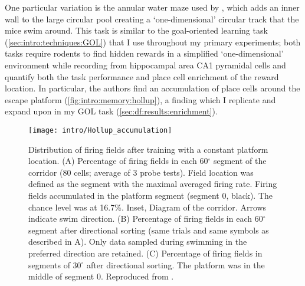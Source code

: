 One particular variation is the annular water maze used by \citeauthor{Hollup2001a}, which adds an inner wall to the large circular pool creating a `one-dimensional' circular track that the mice swim around.
This task is similar to the goal-oriented learning task (\autoref{sec:intro:techniques:GOL}) that I use throughout my primary experiments; both tasks require rodents to find hidden rewards in a simplified `one-dimensional' environment while recording from hippocampal area CA1 pyramidal cells and quantify both the task performance and place cell enrichment of the reward location.
In particular, the authors find an accumulation of place cells around the escape platform (\autoref{fig:intro:memory:hollup}), a finding which I replicate and expand upon in my GOL task (\autoref{sec:df:results:enrichment}). 
\begin{figure}
	\centering
	\texttt{[image: intro/Hollup\_accumulation]}
	\caption[Distribution of firing fields from Hollup et al.]{Distribution of firing fields after training with a constant platform location.
	(A) Percentage of firing fields in each 60$^{\circ}$ segment of the corridor (80 cells; average of 3 probe tests). Field location was defined as the segment with the maximal averaged firing rate. Firing fields accumulated in the platform segment (segment 0, black). The chance level was at 16.7\%. Inset, Diagram of the corridor. Arrows indicate swim direction.
	(B) Percentage of firing fields in each 60$^{\circ}$ segment after directional sorting (same trials and same symbols as described in A). Only data sampled during swimming in the preferred direction are retained.
	(C) Percentage of firing fields in segments of 30$^{\circ}$ after directional sorting. The platform was in the middle of segment 0.
	Reproduced from \citet{Hollup2001a}.}
	\label{fig:intro:memory:hollup}
\end{figure}

